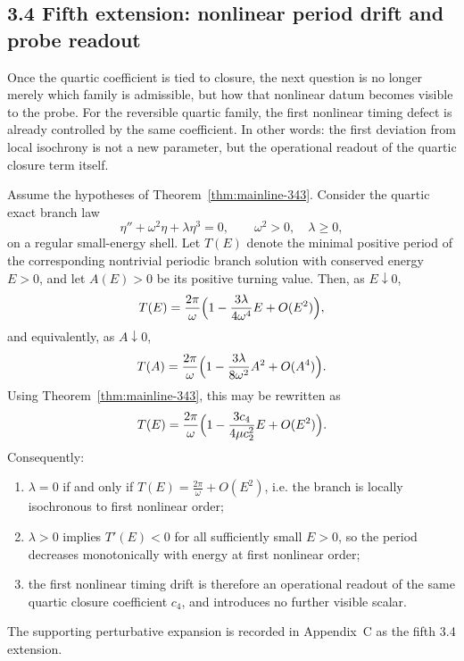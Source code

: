 \subsection*{3.4 Fifth extension: nonlinear period drift and probe readout}
Once the quartic coefficient is tied to closure, the next question is no longer merely which family is admissible, but how that nonlinear datum becomes visible to the probe. For the reversible quartic family, the first nonlinear timing defect is already controlled by the same coefficient. In other words: the first deviation from local isochrony is not a new parameter, but the operational readout of the quartic closure term itself.

\begin{theorem}
\label{thm:mainline-344}
Assume the hypotheses of Theorem~\ref{thm:mainline-343}. Consider the quartic exact branch law
\[
  \eta''+\omega^2\eta+\lambda\eta^3=0,
  \qquad \omega^2>0,\quad \lambda\ge 0,
\]
on a regular small-energy shell. Let $T(E)$ denote the minimal positive period of the corresponding nontrivial periodic branch solution with conserved energy $E>0$, and let $A(E)>0$ be its positive turning value. Then, as $E\downarrow 0$,
\[
  T(E)=\frac{2\pi}{\omega}\Bigl(1-\frac{3\lambda}{4\omega^4}E+O(E^2)\Bigr),
\]
and equivalently, as $A\downarrow 0$,
\[
  T(A)=\frac{2\pi}{\omega}\Bigl(1-\frac{3\lambda}{8\omega^2}A^2+O(A^4)\Bigr).
\]
Using Theorem~\ref{thm:mainline-343}, this may be rewritten as
\[
  T(E)=\frac{2\pi}{\omega}\Bigl(1-\frac{3c_4}{4\mu c_2^2}E+O(E^2)\Bigr).
\]
Consequently:
\begin{enumerate}[label=(\roman*)]
  \item $\lambda=0$ if and only if $T(E)=\tfrac{2\pi}{\omega}+O(E^2)$, i.e. the branch is locally isochronous to first nonlinear order;
  \item $\lambda>0$ implies $T'(E)<0$ for all sufficiently small $E>0$, so the period decreases monotonically with energy at first nonlinear order;
  \item the first nonlinear timing drift is therefore an operational readout of the same quartic closure coefficient $c_4$, and introduces no further visible scalar.
\end{enumerate}
The supporting perturbative expansion is recorded in Appendix~C as the fifth 3.4 extension.
\end{theorem}

